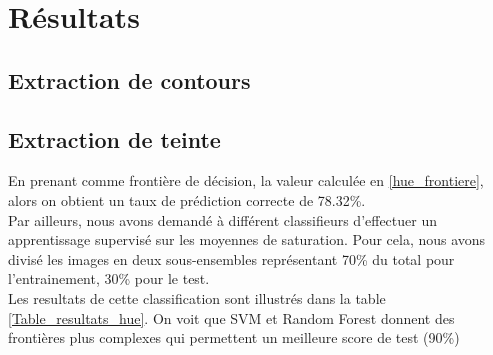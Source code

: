 \documentclass{book}
\begin{document}
\chapter{Résultats}
\section{Extraction de contours}
\section{Extraction de teinte}
En prenant comme frontière de décision, la valeur calculée en \ref{hue_frontiere}, alors on obtient un taux de prédiction correcte de 78.32\%.\\
Par ailleurs, nous avons demandé à différent classifieurs d'effectuer un apprentissage supervisé sur les moyennes de saturation. Pour cela, nous avons divisé les images
en deux sous-ensembles représentant 70\% du total pour l'entrainement, 30\% pour le test.\\
Les resultats de cette classification sont illustrés dans la table \ref{Table_resultats_hue}. On voit que SVM et Random Forest donnent des frontières plus complexes qui permettent
un meilleure score de test (90\%)
\end{document}
